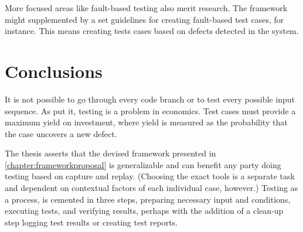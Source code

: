\documentclass[12pt,a4paper,oneside,pdftex]{report}
\begin{document}
{More focused areas like fault-based testing also merit research. The framework might supplemented by a set guidelines for creating fault-based test cases, for instance. This means creating tests cases based on defects detected in the system.




\begin{comment}
Future research:
capture playback popular still despite warnings, what's up? when is it not applicable?
relationship between automation and manual work, test automation manual maintenance
integration test strategy in the vein if rehmann, what options/technical strategies are there? tired old big-bang
Strategies for test case creation (zeng & tan 2013)
study merits of fault based testing for more efficient tests
distinction between a technological configuration and process model is difficult.

notion of unit to system antiquated, block to block also
more an issue of test case construction and traceability
end-to-end tests are adequate if they can point to problem code accurately
\end{comment}

\chapter{Conclusions}
\label{chapter:conclusions}

It is not possible to go through every code branch or to test every possible input sequence. As \citet{myers1976software} put it, testing is a problem in economics. Test cases must provide a maximum yield on investment, where yield is measured as the probability that the case uncovers a new defect. \citep{myers1976software} 

The thesis asserts that the devised framework presented in \ref{chapter:frameworkproposal} is generalizable and can benefit any party doing testing based on capture and replay. (Choosing the exact tools is a separate task and dependent on contextual factors of each individual case, however.) Testing as a process, is cemented in three steps, preparing necessary input and conditions, executing tests, and verifying results, perhaps with the addition of a clean-up step logging test results or creating test reports.

}
\end{document}
